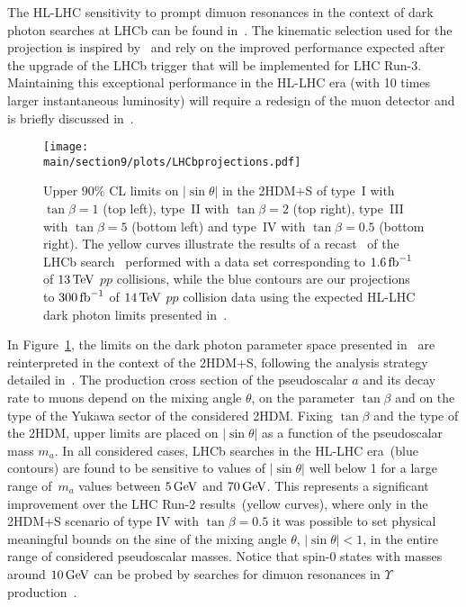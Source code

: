 The HL-LHC sensitivity to prompt dimuon resonances in the context of dark photon searches at LHCb can be found in~\cite{Bediaga:2018lhg}. The kinematic selection used for the projection is inspired by~\cite{Ilten:2016tkc} and rely on the improved performance expected after the upgrade of the LHCb trigger that will be implemented for LHC Run-3. Maintaining this exceptional performance in the HL-LHC era (\ie with 10 times larger instantaneous luminosity) will require a redesign of the muon detector and is briefly discussed in~\cite{Bediaga:2018lhg}.

\begin{figure}[ht!]
\centering
\texttt{[image: \\main/section9/plots/LHCbprojections.pdf]}
\vspace{2mm}
\caption{Upper $90\%$ CL limits on $|\!\sin\theta|$ in the 2HDM+S of type~I with $\tan\beta =1$ (top left), type~II with $\tan\beta =2$ (top right), type~III with $\tan\beta = 5$ (bottom left) and type~IV with $\tan\beta = 0.5$ (bottom right). The yellow curves illustrate the results of a recast~\cite{Haisch:2018kqx} of the LHCb search~\cite{Aaij:2017rft} performed with a data set corresponding to $1.6\, {\rm fb}^{-1}$ of $13 \, {\rm TeV}$ $pp$ collisions, while the blue contours are our projections to $300 \, {\rm fb}^{-1}$ of $14 \, {\rm TeV}$ $pp$ collision data using the expected HL-LHC dark photon limits presented in~\cite{Bediaga:2018lhg}. }\label{fig:lhcb_lightmumu}
\end{figure}

In Figure~\ref{fig:lhcb_lightmumu}, the limits on the dark photon parameter space presented in~\cite{Bediaga:2018lhg} are reinterpreted in the context of the 2HDM+S, following the analysis strategy detailed in~\cite{Haisch:2018kqx}. The production cross section of the pseudoscalar $a$ and its decay rate to muons depend on the mixing angle $\theta$, on the parameter $\tan\beta$ and on the type of the Yukawa sector of the considered 2HDM. Fixing $\tan\beta$ and the type of the 2HDM, upper limits are placed on $|\!\sin\theta|$ as a function of the pseudoscalar mass $m_a$. In all considered cases, LHCb searches in the HL-LHC era~(blue contours) are found to be sensitive to values of $|\!\sin\theta|$ well below 1 for a large range of~$m_a$ values between $5 \, {\rm GeV}$ and $70 \, {\rm GeV}$. This represents a significant improvement over the LHC Run-2 results~(yellow curves), where only in the 2HDM+S scenario of type IV with $\tan \beta = 0.5$ it was possible to set physical meaningful bounds on the sine of the mixing angle $\theta$, \ie $|\!\sin\theta| < 1$, in the entire range of considered pseudoscalar masses. Notice that spin-0 states with masses around $10 \, {\rm GeV}$ can be probed by searches for dimuon resonances in $\Upsilon$ production~\cite{Haisch:2016hzu,Aaij:2018xpt}.
